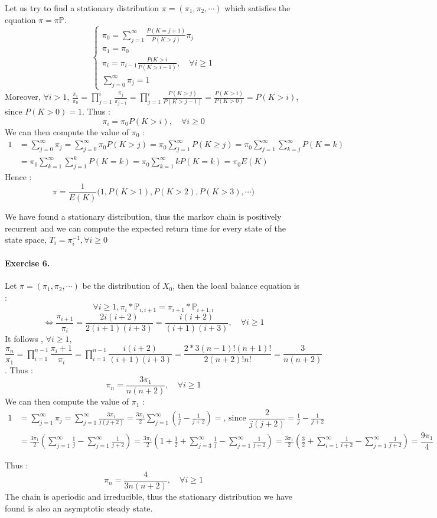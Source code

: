 \documentclass{article}
\begin{document}
Let us try to find a stationary distribution $\pi=(\pi_1,\pi_2,\cdots)$ which satisfies the equation $\pi=\pi \mathbb{P}$.
$$ \displaystyle \left \{
    \begin{array}{ll}
        \pi_0=\sum_{j=1}^{\infty} \frac{P(K=j+1)}{P(K>j)}\pi_j \\
		\pi_1=\pi_0 \\
		\pi_i=\pi_{i-1}\frac{P(K>i}{P(K>i-1)}, \quad \forall i \geq 1\\
		\sum_{j=0}^{\infty} \pi_j =1
    \end{array}
\right. $$
Moreover, $\displaystyle \forall i>1$, $\frac{\pi_i}{\pi_0}=\prod_{j=1}^i \frac{\pi_j}{\pi_{j-1}}=\prod_{j=1}^i\frac{P(K>j)}{P(K>j-1)}=\frac{P(K>i)}{P(K>0)}=P(K>i)$, since $P(K>0)=1$. Thus : $$\pi_i=\pi_0 P(K>i),\quad \forall i \geq 0 $$ 
We can then compute the value of $\pi_0$  :
\begin{align*}
\displaystyle
1 &= \sum_{j=0}^{\infty} \pi_j=\sum_{j=0}^{\infty} \pi_0P(K>j) 
= \pi_0 \sum_{j=1}^{\infty} P(K \geq j)=\pi_0 \sum_{j=1}^{\infty}  \sum_{k=j}^{\infty} P(K=k) 
\\
 &=\pi_0 \sum_{k=1}^{\infty}  \sum_{j=1}^{k} P(K=k)
=\pi_0 \sum_{k=1}^{\infty}  k P(K=k)
=\pi_0 E(K)
\end{align*}
Hence : 
$$\displaystyle \pi=\dfrac{1}{E(K)} \pmb{(} 1,P(K>1),P(K>2),P(K>3),\cdots \pmb{)}$$


We have found a stationary distribution, thus the markov chain is positively recurrent and we can compute the expected return time for every state of the state space, $T_i=\pi_i^{-1}, \forall i \geq 0$

\paragraph{Exercise 6.}

Let $\pi=(\pi_1,\pi_2,\cdots)$ be the distribution of $X_0$, then the local balance equation is :
$$\forall i \geq 1, \pi_i *\mathbb{P}_{i,i+1}=\pi_{i+1} *\mathbb{P}_{i+1,i} $$
$$\iff \dfrac{\pi_{i+1}}{\pi_{i}}=\dfrac{2i(i+2)}{2(i+1)(i+3)}= \dfrac{i(i+2)}{(i+1)(i+3)}, \quad \forall i \geq 1$$
It follows , $\displaystyle \forall i \geq 1$, $\dfrac{\pi_n}{\pi_1}=\prod_{i=1}^{n-1} \dfrac{\pi_i+1}{\pi_{i}}=\prod_{i=1}^{n-1} \dfrac{i(i+2)}{(i+1)(i+3)}=\dfrac{2*3(n-1)!(n+1)!}{2(n+2)!n!}=\dfrac{3}{n(n+2)}$. Thus : $$\pi_n=\dfrac{3\pi_1}{n(n+2)},\quad \forall i \geq 1 $$ 
We can then compute the value of $\pi_1$  :
\begin{align*}
1 &= \sum_{j=1}^{\infty} \pi_j=\sum_{j=1}^{\infty} \frac{3\pi_1}{j(j+2)} =\frac{3\pi_1}{2} \sum_{j=1}^{\infty} (\frac{1}{j}-\frac{1}{j+2})= \text{, since }\dfrac{2}{j(j+2)}=\frac{1}{j}-\frac{1}{j+2} \\
 &=\frac{3\pi_1}{2} \left( \sum_{j=1}^{\infty} \frac{1}{j}-\sum_{j=1}^{\infty} \frac{1}{j+2} \right) =\frac{3\pi_1}{2} \left(1 +\frac{1}{2} + \sum_{j=3}^{\infty} \frac{1}{j}-\sum_{j=1}^{\infty} \frac{1}{j+2} \right)=\frac{3\pi_1}{2} \left(\frac{3}{2} + \sum_{i=1}^{\infty} \frac{1}{i+2}-\sum_{j=1}^{\infty} \frac{1}{j+2} \right)=\dfrac{9\pi_1}{4}
\end{align*}

Thus : $$\pi_n=\frac{4}{3n(n+2)},\quad \forall i \geq 1 $$ 
The chain is aperiodic and irreducible, thus the stationary distribution we have found is also an asymptotic steady state.
\end{document}
